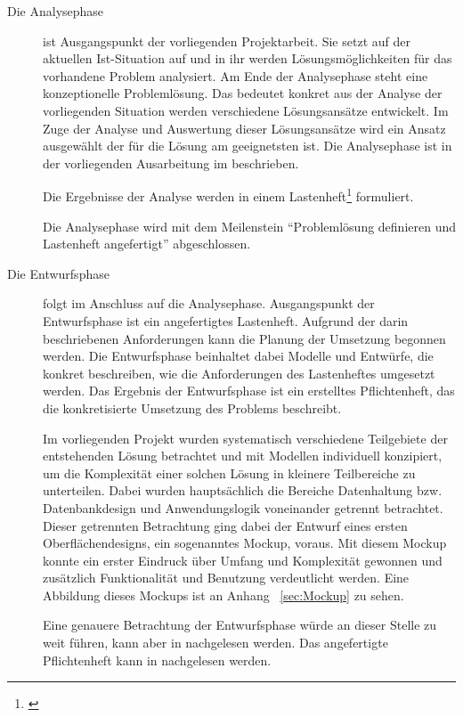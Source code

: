 \begin{description}

  \item[Die Analysephase] ist Ausgangspunkt der vorliegenden Projektarbeit. Sie setzt
  auf der aktuellen Ist-Situation auf und in ihr werden Lösungsmöglichkeiten für
  das vorhandene Problem analysiert. Am Ende der Analysephase steht eine
  konzeptionelle Problemlösung. Das bedeutet konkret aus der Analyse der
  vorliegenden Situation werden verschiedene Lösungsansätze entwickelt. Im
  Zuge der Analyse und Auswertung dieser Lösungsansätze wird ein Ansatz
  ausgewählt der für die Lösung am geeignetsten ist. Die Analysephase ist in
  der vorliegenden Ausarbeitung im  beschrieben.

  Die Ergebnisse der Analyse werden in einem Lastenheft\footnote{\citet{lastenheft2013}} formuliert.

  Die Analysephase wird mit dem Meilenstein "`Problemlösung definieren und
  Lastenheft angefertigt"' abgeschlossen. 


  \item[Die Entwurfsphase] folgt im Anschluss auf die Analysephase.
  Ausgangspunkt der Entwurfsphase ist ein angefertigtes Lastenheft. Aufgrund der
  darin beschriebenen Anforderungen kann die Planung der Umsetzung
  begonnen werden. Die
  Entwurfsphase beinhaltet dabei Modelle und Entwürfe, 
  die konkret beschreiben, wie die
  Anforderungen des Lastenheftes umgesetzt werden. Das Ergebnis der Entwurfsphase ist ein erstelltes Pflichtenheft, das die konkretisierte Umsetzung des Problems
  beschreibt.

  Im vorliegenden Projekt wurden systematisch verschiedene Teilgebiete der
  entstehenden Lösung betrachtet und mit Modellen individuell konzipiert, um die
  Komplexität einer solchen Lösung in kleinere Teilbereiche zu unterteilen. Dabei
  wurden hauptsächlich die Bereiche Datenhaltung bzw. Datenbankdesign und
  Anwendungslogik voneinander getrennt betrachtet. Dieser getrennten Betrachtung
  ging dabei der Entwurf eines ersten Oberflächendesigns, ein sogenanntes
  Mockup, voraus. Mit diesem Mockup konnte ein erster Eindruck über Umfang und
  Komplexität gewonnen und zusätzlich Funktionalität und Benutzung
  verdeutlicht werden. Eine Abbildung dieses Mockups ist an Anhang ~\ref{sec:Mockup} zu sehen.

  Eine genauere Betrachtung der Entwurfsphase würde an dieser Stelle zu weit führen,
  kann aber in \citet{modelierungUndBetrieb2014} nachgelesen werden.
  Das angefertigte Pflichtenheft kann in \citet{pflichtenheft2013} nachgelesen werden.


\end{description}
